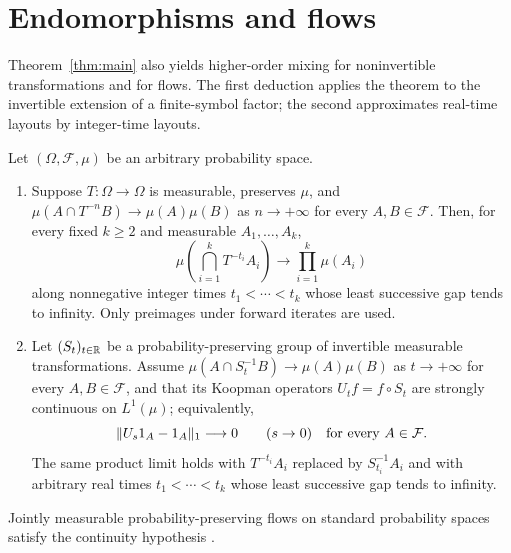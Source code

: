 \section{Endomorphisms and flows}
\label{sec:consequences}

Theorem~\ref{thm:main} also yields higher-order mixing for noninvertible
transformations and for flows. The first deduction applies the theorem
to the invertible extension of a finite-symbol factor; the second
approximates real-time layouts by integer-time layouts.

\begin{corollary}
\label{cor:endomorphisms-flows}
Let $(\Omega,\mathcal F,\mu)$ be an arbitrary probability space.
\begin{enumerate}
\item Suppose $T:\Omega\to\Omega$ is measurable, preserves $\mu$, and
$\mu(A\cap T^{-n}B)\to\mu(A)\mu(B)$ as $n\to+\infty$ for every
$A,B\in\mathcal F$. Then, for every fixed $k\ge2$ and measurable
$A_1,\ldots,A_k$,
\[
 \mu\left(\bigcap_{i=1}^kT^{-t_i}A_i\right)
 \longrightarrow\prod_{i=1}^k\mu(A_i)
\]
along nonnegative integer times $t_1<\cdots<t_k$ whose least successive
gap tends to infinity. Only preimages under forward iterates are used.
\item Let $(S_t)_{t\in\mathbb R}$ be a probability-preserving group of invertible
measurable transformations. Assume
$\mu(A\cap S_t^{-1}B)\to\mu(A)\mu(B)$ as $t\to+\infty$ for every
$A,B\in\mathcal F$, and that its Koopman operators $U_t f=f\circ S_t$
are strongly continuous on $L^1(\mu)$; equivalently,
\[
 \lVert U_s1_A-1_A\rVert_1\longrightarrow0\qquad(s\to0)
 \quad\text{for every }A\in\mathcal F.
\]
The same product limit holds with $T^{-t_i}A_i$ replaced by
$S_{t_i}^{-1}A_i$ and with arbitrary real times
$t_1<\cdots<t_k$ whose least successive gap tends to infinity.
\end{enumerate}
\end{corollary}

Jointly measurable probability-preserving flows on standard probability
spaces satisfy the continuity hypothesis
\cite[Section~1.7, p.~7]{Rokhlin1960}.

